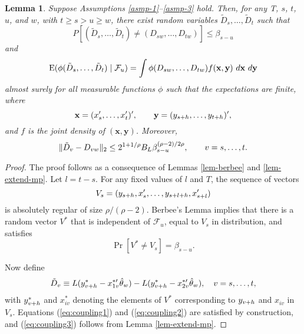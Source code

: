\documentclass[11pt]{article}
\newtheorem{lem}{Lemma}
\begin{document}
\begin{lem}\label{lem-basic-coupling}
  Suppose Assumptions \ref{asmp-1}--\ref{asmp-3} hold.  Then, for any
  T, $s$, $t$, $u$, and $w$, with $t \geq s > u \geq w$, there exist random
  variables $\tilde D_s,\dots,\tilde D_t$ such that
  \begin{equation}\label{eq:coupling1}
    P[(\tilde D_s,\dots,\tilde D_t) \neq (D_{sw},\dots,D_{tw})] \leq \beta_{s-u}
  \end{equation}
  and
  \begin{equation}\label{eq:coupling2}
    \E(\phi(\tilde D_s,\dots, \tilde D_t) \mid \mathcal{F}_u ) = 
    \int
    \phi(D_{sw},\dots,D_{tw}) f(\mathbf{x}, \mathbf{y})\ d\mathbf{x}\ d\mathbf{y}
  \end{equation}
  almost surely for all measurable functions $\phi$ such that the
  expectations are finite, where 
  \[ \mathbf{x} = (x_{s}', \dots, x_{t}')', \qquad
  \mathbf{y} = (y_{s+h},\dots,y_{t+h})',\] and $f$ is the
  joint density of $(\mathbf{x}, \mathbf{y})$.  Moreover,
 \begin{equation}\label{eq:coupling3}
   \| \tilde D_v - D_{vw} \|_2 \leq 2^{1+1/\rho} B_L
   \beta_{s-u}^{(\rho-2)/2\rho}, \qquad v = s,\dots,t.
 \end{equation}
\end{lem}

\begin{proof}
  The proof follows as a consequence of Lemmas \ref{lem-berbee} and
  \ref{lem-extend-mp}.  Let $l = t-s$.  For any fixed values of $l$
  and $T$, the sequence of vectors
  \[ V_s = (y_{s+h}, x_{s}', \dots, y_{s+l+h}, x_{s+l}') \] is
  absolutely regular of size $\rho/(\rho-2)$.  Berbee's Lemma implies
  that there is a random vector $V^*$ that is independent of
  $\mathcal{F}_u$, equal to $V_s$ in distribution, and satisfies
  \[\Pr[V^* \neq V_s] = \beta_{s-u}.\]

  Now define
  \[ \tilde D_v \equiv L(y_{v+h}^* - x_{1v}^{*\prime} \hat{\theta}_w)
  - L(y_{v+h}^* - x_{2v}^{*\prime} \hat{\theta}_w), \quad v =
  s,\dotsc, t,
  \]
  with $y_{v+h}^*$ and $x_{iv}^*$ denoting the elements of $V^*$
  corresponding to $y_{v+h}$ and $x_{iv}$ in $V_s$.  Equations
  (\ref{eq:coupling1}) and (\ref{eq:coupling2}) are satisfied by
  construction, and (\ref{eq:coupling3}) follows from Lemma
  \ref{lem-extend-mp}.
\end{proof}
\end{document}
